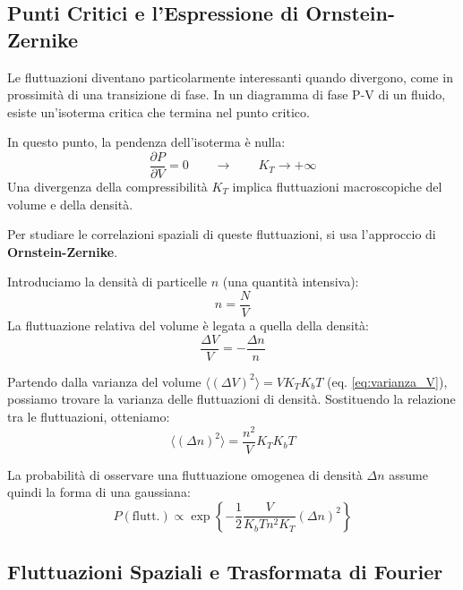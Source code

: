 \subsection*{Punti Critici e l'Espressione di Ornstein-Zernike}

Le fluttuazioni diventano particolarmente interessanti quando divergono, come in prossimità di una transizione di fase. In un diagramma di fase P-V di un fluido, esiste un'isoterma critica che termina nel punto critico.

In questo punto, la pendenza dell'isoterma è nulla:
\begin{equation}
    \frac{\partial P}{\partial V}=0 \quad \quad \longrightarrow \quad \quad K_{T}\rightarrow+\infty
    \label{eq:punto_critico}
\end{equation}
Una divergenza della compressibilità $K_T$ implica fluttuazioni macroscopiche del volume e della densità.

Per studiare le correlazioni spaziali di queste fluttuazioni, si usa l'approccio di \textbf{Ornstein-Zernike}.

Introduciamo la densità di particelle $n$ (una quantità intensiva):
\begin{equation}
    n=\frac{N}{V}
    \label{eq:def_n}
\end{equation}
La fluttuazione relativa del volume è legata a quella della densità:
\begin{equation}
    \frac{\Delta V}{V}=-\frac{\Delta n}{n}
    \label{eq:flutt_V_n}
\end{equation}

Partendo dalla varianza del volume $\langle(\Delta V)^{2}\rangle=VK_{T}K_{b}T$ (eq. \ref{eq:varianza_V}), possiamo trovare la varianza delle fluttuazioni di densità. Sostituendo la relazione tra le fluttuazioni, otteniamo:
\begin{equation}
    \langle(\Delta n)^{2}\rangle=\frac{n^{2}}{V}K_{T}K_{b}T
    \label{eq:varianza_n}
\end{equation}

La probabilità di osservare una fluttuazione omogenea di densità $\Delta n$ assume quindi la forma di una gaussiana:
\begin{equation}
    P(\text{flutt.}) \propto \exp\left\{-\frac{1}{2}\frac{V}{K_{b}Tn^{2}K_{T}}(\Delta n)^{2}\right\}
    \label{eq:prob_flutt_n}
\end{equation}

\subsection*{Fluttuazioni Spaziali e Trasformata di Fourier}

